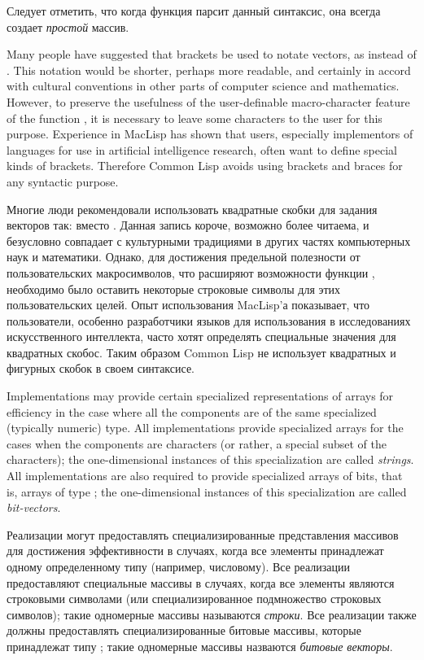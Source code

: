 Следует отметить, что когда функция  парсит данный синтаксис, она
всегда создает {\it простой} массив.

\beforenoterule
\begin{rationale}
Many people have suggested that brackets be used
to notate vectors, as 
instead of .  This notation
would be shorter, perhaps more readable, and certainly in accord with
cultural conventions in other parts of computer science and mathematics.
However, to preserve the usefulness of the user-definable macro-character
feature of the function , it is necessary to leave some
characters to the user for this purpose.  Experience in MacLisp has
shown that users, especially implementors of languages for use
in artificial intelligence research, often want
to define special kinds of brackets.  Therefore Common Lisp avoids using
brackets and braces for any syntactic purpose.

Многие люди рекомендовали использовать квадратные скобки для задания векторов
так:  вместо . Данная запись
короче, возможно более читаема, и безусловно совпадает с культурными традициями
в других частях компьютерных наук и математики. Однако, для достижения
предельной полезности от пользовательских макросимволов, что расширяют
возможности функции , необходимо было оставить некоторые строковые
символы для этих пользовательских целей. Опыт использования MacLisp'а
показывает, что пользователи, особенно разработчики языков для использования в
исследованиях искусственного интеллекта, часто хотят определять специальные
значения для квадратных скобос. Таким образом Common Lisp не использует
квадратных и фигурных скобок в своем синтаксисе.
\end{rationale}
\afternoterule

Implementations may provide certain specialized representations of
arrays for efficiency in the case where all the components are of
the same specialized (typically numeric) type.  All implementations
provide specialized arrays for the cases when the components
are characters (or rather, a special subset of the characters);
the one-dimensional instances of
this specialization are called {\it strings}.
All implementations are also required to provide specialized arrays
of bits, that is, arrays of type ;
the one-dimensional instances of
this specialization are called {\it bit-vectors}.

Реализации могут предоставлять специализированные представления массивов для
достижения эффективности в случаях, когда все элементы принадлежат одному
определенному типу (например, числовому). Все реализации предоставляют
специальные массивы в случаях, когда все элементы являются строковыми символами
(или специализированное подмножество строковых символов);
такие одномерные массивы называются {\it строки}.
Все реализации также должны предоставлять специализированные битовые массивы,
которые принадлежат типу ;
такие одномерные массивы назваются {\it битовые векторы}.


